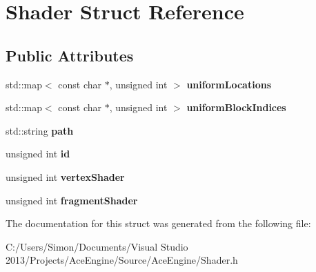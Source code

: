 \hypertarget{struct_shader}{}\section{Shader Struct Reference}
\label{struct_shader}
\subsection*{Public Attributes}
\begin{DoxyCompactItemize}
\item 
\hypertarget{struct_shader_a5c62b75f7315004d5584df5ca9f8b7b6}{}std\+::map$<$ const char $\ast$, unsigned int $>$ {\bfseries uniform\+Locations}\label{struct_shader_a5c62b75f7315004d5584df5ca9f8b7b6}

\item 
\hypertarget{struct_shader_a85a5911a2984cfd52ca4ed72ebd1e3c8}{}std\+::map$<$ const char $\ast$, unsigned int $>$ {\bfseries uniform\+Block\+Indices}\label{struct_shader_a85a5911a2984cfd52ca4ed72ebd1e3c8}

\item 
\hypertarget{struct_shader_a1e49a403b16a5b27e6f203cdf41c6e5f}{}std\+::string {\bfseries path}\label{struct_shader_a1e49a403b16a5b27e6f203cdf41c6e5f}

\item 
\hypertarget{struct_shader_af3eee7628d291077cfa66dcc83df83a2}{}unsigned int {\bfseries id}\label{struct_shader_af3eee7628d291077cfa66dcc83df83a2}

\item 
\hypertarget{struct_shader_a354f7d1afcd38ab33c3f689ba968d4f3}{}unsigned int {\bfseries vertex\+Shader}\label{struct_shader_a354f7d1afcd38ab33c3f689ba968d4f3}

\item 
\hypertarget{struct_shader_a344fb10044edfde57cbd6edf267832a9}{}unsigned int {\bfseries fragment\+Shader}\label{struct_shader_a344fb10044edfde57cbd6edf267832a9}

\end{DoxyCompactItemize}


The documentation for this struct was generated from the following file\+:\begin{DoxyCompactItemize}
\item 
C\+:/\+Users/\+Simon/\+Documents/\+Visual Studio 2013/\+Projects/\+Ace\+Engine/\+Source/\+Ace\+Engine/Shader.\+h\end{DoxyCompactItemize}

